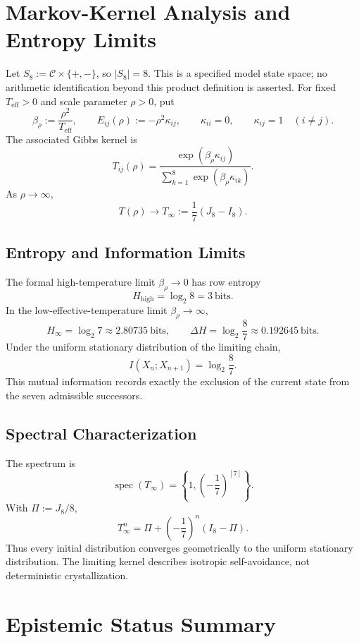 \documentclass[11pt,a4paper]{article}
\begin{document}
\section{Markov-Kernel Analysis and Entropy Limits}

Let $S_8:=\mathcal C\times\{+,-\}$, so $|S_8|=8$. This is a specified
model state space; no arithmetic identification beyond this product definition
is asserted. For fixed $T_{\mathrm{eff}}>0$ and scale parameter $\rho>0$, put
\[
\beta_\rho:=\frac{\rho^2}{T_{\mathrm{eff}}},
\qquad
E_{ij}(\rho):=-\rho^2\kappa_{ij},
\qquad
\kappa_{ii}=0,
\qquad
\kappa_{ij}=1\quad(i\ne j).
\]
The associated Gibbs kernel is
\[
T_{ij}(\rho)
=\frac{\exp(\beta_\rho\kappa_{ij})}
{\sum_{k=1}^8\exp(\beta_\rho\kappa_{ik})}.
\]
As $\rho\to\infty$,
\[
T(\rho)\longrightarrow T_\infty:=\frac17(J_8-I_8).
\]

\subsection{Entropy and Information Limits}

The formal high-temperature limit $\beta_\rho\to0$ has row entropy
\[
H_{\mathrm{high}}=\log_2 8=3\ \mathrm{bits}.
\]
In the low-effective-temperature limit $\beta_\rho\to\infty$,
\[
H_\infty=\log_2 7\approx2.80735\ \mathrm{bits},
\qquad
\Delta H=\log_2\frac87\approx0.192645\ \mathrm{bits}.
\]
Under the uniform stationary distribution of the limiting chain,
\[
I(X_n;X_{n+1})=\log_2\frac87.
\]
This mutual information records exactly the exclusion of the current state
from the seven admissible successors.

\subsection{Spectral Characterization}

The spectrum is
\[
\operatorname{spec}(T_\infty)
=\left\{1,\left(-\frac17\right)^{[7]}\right\}.
\]
With $\Pi:=J_8/8$,
\[
T_\infty^n
=\Pi+\left(-\frac17\right)^n(I_8-\Pi).
\]
Thus every initial distribution converges geometrically to the uniform
stationary distribution. The limiting kernel describes isotropic
self-avoidance, not deterministic crystallization.

\section{Epistemic Status Summary}
\end{document}
